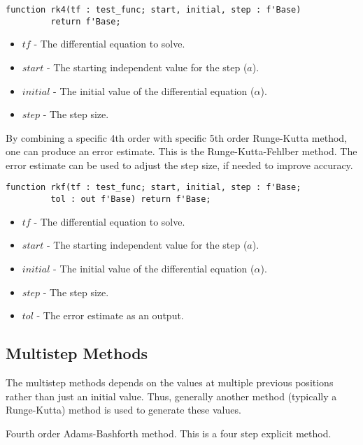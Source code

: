 \documentclass[10pt, openany]{book}
\begin{document}
\begin{lstlisting}
function rk4(tf : test_func; start, initial, step : f'Base)
         return f'Base;
\end{lstlisting}
\begin{itemize}
  \item $tf$ - The differential equation to solve.
  \item $start$ - The starting independent value for the step ($a$).
  \item $initial$ - The initial value of the differential equation ($\alpha$).
  \item $step$ - The step size.
\end{itemize}

By combining a specific 4th order with specific 5th order Runge-Kutta method, one can produce an error estimate.  This is the Runge-Kutta-Fehlber method.  The error estimate can be used to adjust the step size, if needed to improve accuracy.

\begin{lstlisting}
function rkf(tf : test_func; start, initial, step : f'Base;
         tol : out f'Base) return f'Base;
\end{lstlisting}
\begin{itemize}
  \item $tf$ - The differential equation to solve.
  \item $start$ - The starting independent value for the step ($a$).
  \item $initial$ - The initial value of the differential equation ($\alpha$).
  \item $step$ - The step size.
  \item $tol$ - The error estimate as an output.
\end{itemize}

\subsection{Multistep Methods}
The multistep methods depends on the values at multiple previous positions rather than just an initial value.  Thus, generally another method (typically a Runge-Kutta) method is used to generate these values.

Fourth order Adams-Bashforth method.  This is a four step explicit method.
\end{document}
